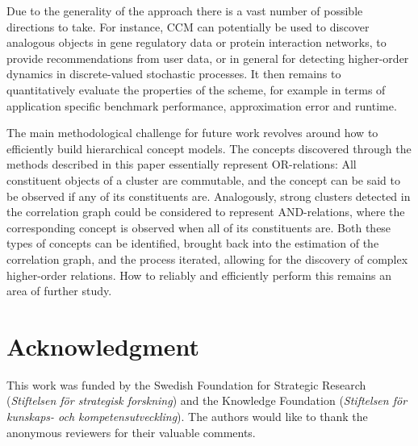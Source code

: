 \documentclass[conference]{IEEEtran}
\begin{document}
Due to the generality of the approach there is a vast number of possible directions to take. For instance, CCM can 
potentially be used to discover analogous objects in gene regulatory data or protein interaction networks, to provide 
recommendations from user data, or in general for detecting higher-order dynamics in 
discrete-valued stochastic processes. It then remains to quantitatively evaluate the properties of the scheme, for example in 
terms of application specific benchmark performance, approximation error and runtime. 

The main methodological challenge for future work revolves around how to efficiently build hierarchical concept models.
The concepts discovered through the methods described in this paper essentially represent OR-relations: All constituent
objects of a cluster are commutable, and the concept can be said to be observed if any of its constituents
are. Analogously, strong clusters detected in the correlation graph could be considered to represent AND-relations,
where the corresponding concept is observed when all of its constituents are. Both these types of
concepts can be identified, brought back into the estimation of the correlation graph, and the process
iterated, allowing for the discovery of complex higher-order relations. How to reliably and efficiently perform this
remains an area of further study.

\section*{Acknowledgment}
This work was funded by the Swedish Foundation for Strategic Research (\emph{Stiftelsen f\"or strategisk forskning}) 
and the Knowledge Foundation (\emph{Stiftelsen f\"or kunskaps- och kompetensutveckling}). 
The authors would like to thank the anonymous reviewers for their valuable comments.



%
%
%




\end{document}
